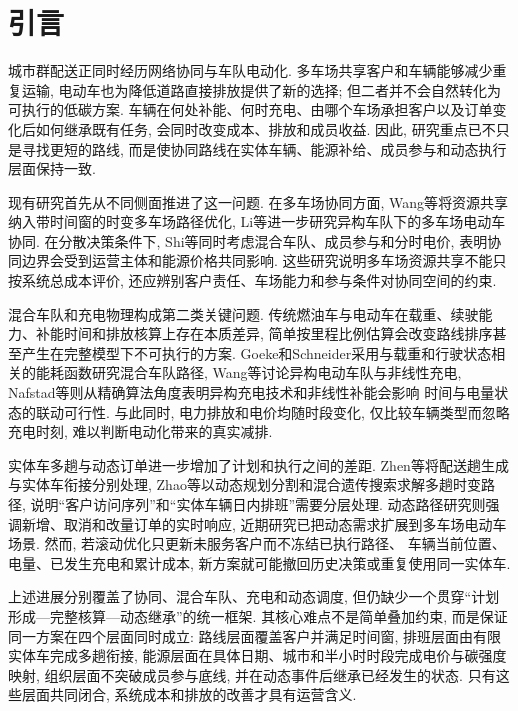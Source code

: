 \section{引言}

城市群配送正同时经历网络协同与车队电动化.
多车场共享客户和车辆能够减少重复运输,
电动车也为降低道路直接排放提供了新的选择;
但二者并不会自然转化为可执行的低碳方案.
车辆在何处补能、何时充电、由哪个车场承担客户以及订单变化后如何继承既有任务,
会同时改变成本、排放和成员收益.
因此, 研究重点已不只是寻找更短的路线,
而是使协同路线在实体车辆、能源补给、成员参与和动态执行层面保持一致.

现有研究首先从不同侧面推进了这一问题.
在多车场协同方面,
Wang等\cite{ref:89}将资源共享纳入带时间窗的时变多车场路径优化,
Li等\cite{ref:93}进一步研究异构车队下的多车场电动车协同.
在分散决策条件下,
Shi等\cite{ref:90}同时考虑混合车队、成员参与和分时电价,
表明协同边界会受到运营主体和能源价格共同影响.
这些研究说明多车场资源共享不能只按系统总成本评价,
还应辨别客户责任、车场能力和参与条件对协同空间的约束.

混合车队和充电物理构成第二类关键问题.
传统燃油车与电动车在载重、续驶能力、补能时间和排放核算上存在本质差异,
简单按里程比例估算会改变路线排序甚至产生在完整模型下不可执行的方案.
Goeke和Schneider\cite{ref:27}采用与载重和行驶状态相关的能耗函数研究混合车队路径,
Wang等\cite{ref:80}讨论异构电动车队与非线性充电,
Nafstad等\cite{ref:94}则从精确算法角度表明异构充电技术和非线性补能会影响
时间与电量状态的联动可行性.
与此同时, 电力排放和电价均随时段变化,
仅比较车辆类型而忽略充电时刻, 难以判断电动化带来的真实减排.

实体车多趟与动态订单进一步增加了计划和执行之间的差距.
Zhen等\cite{ref:44}将配送趟生成与实体车衔接分别处理,
Zhao等\cite{ref:91}以动态规划分割和混合遗传搜索求解多趟时变路径,
说明“客户访问序列”和“实体车辆日内排班”需要分层处理.
动态路径研究则强调新增、取消和改量订单的实时响应\cite{ref:14,ref:18},
近期研究已把动态需求扩展到多车场电动车场景\cite{ref:92}.
然而, 若滚动优化只更新未服务客户而不冻结已执行路径、
车辆当前位置、电量、已发生充电和累计成本,
新方案就可能撤回历史决策或重复使用同一实体车.

上述进展分别覆盖了协同、混合车队、充电和动态调度,
但仍缺少一个贯穿“计划形成—完整核算—动态继承”的统一框架.
其核心难点不是简单叠加约束,
而是保证同一方案在四个层面同时成立:
路线层面覆盖客户并满足时间窗,
排班层面由有限实体车完成多趟衔接,
能源层面在具体日期、城市和半小时时段完成电价与碳强度映射,
组织层面不突破成员参与底线,
并在动态事件后继承已经发生的状态.
只有这些层面共同闭合, 系统成本和排放的改善才具有运营含义.

